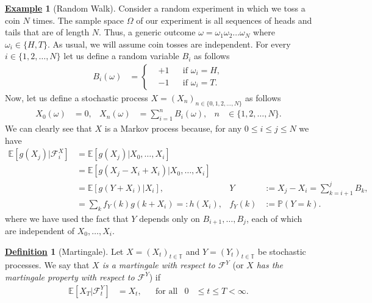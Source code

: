 \documentclass[12pt]{book}
\numberwithin{equation}{chapter}
\theoremstyle{plain}
\numberwithin{theorem}{section}
\theoremstyle{definition}
\newtheorem{definition}[theorem]{\underline{Definition}}
\newtheorem{example}[theorem]{\underline{Example}}
\numberwithin{exercise}{chapter}
\newcommand{\<}{\langle}
\renewcommand{\>}{\rangle}
\renewcommand{\(}{\left(}
\renewcommand{\)}{\right)}
\renewcommand{\[}{\left[}
\renewcommand{\]}{\right]}
\newcommand\Eb{\mathds{E}}
\newcommand\Pb{\mathds{P}}
\newcommand\Fc{\mathscr{F}}
\newcommand\om{\omega}
\newcommand\Om{\Omega}
\theoremstyle{definition}
\numberwithin{question}{section}
\begin{document}
\begin{example}[Random Walk]
\label{ex:rw}
Consider a random experiment in which we toss a coin $N$ times.
The sample space $\Om$ of our experiment is all sequences of heads and tails that are of length $N$.
Thus, a generic outcome $\om = \om_1 \om_2 \ldots \om_N$ where $\om_i \in \{H,T\}$.
As usual, we will assume coin tosses are independent.
For every $i \in \{ 1, 2, \ldots, N \}$ let us define a random variable $B_i$ as follows
\begin{align}
B_i(\om)
	&=	\left\{ \begin{aligned}
			&+1 &&\text{if $\om_i=H$} , \\
			&-1 &&\text{if $\om_i=T$} .
			\end{aligned} \right.
\end{align} 
Now, let us define a stochastic process $X = (X_n)_{n \in \{0,1,2,\ldots,N\}}$ as follows
\begin{align}
X_0(\om)
	&=	0 , &
X_n(\om)
	&=	\sum_{i=1}^n B_i(\om) , &
n
	&\in \{1, 2, \ldots, N \} .
\end{align}
We can clearly see that $X$ is a Markov process because, for any $0 \leq i \leq j \leq N$ we have
\begin{align}
\Eb[ g(X_j) | \Fc_i^X ]
	&=	\Eb[ g(X_j) | X_0, \ldots, X_i ] \\
	&=	\Eb[ g( X_j - X_i + X_i) | X_0, \ldots, X_i ] \\
	&=	\Eb[ g( Y + X_i) | X_i ] , &
Y
	&:=	X_j - X_i = \sum_{k=i+1}^j B_k , \\
	&=	\sum_{k} f_Y(k) g(k + X_i) =: h(X_i), &
f_Y(k)
	&:=	\Pb( Y = k) .
\end{align}
where we have used the fact that $Y$ depends only on $B_{i+1}, \ldots, B_j$, each of which are independent of $X_0, \ldots, X_i$.
\end{example}

\begin{definition}[Martingale]
\label{def:martingale}
Let $X = (X_t)_{t \in \mathds{T}}$ and $Y=(Y_t)_{t \in \mathds{T}}$ be stochastic processes.
We say that \textit{$X$ is a martingale with respect to $\Fc^Y$} (or \textit{$X$ has the martingale property with respect to $\Fc^Y$}) if
\begin{align}
\Eb[ X_T | \Fc_t^Y ]
	&=	X_t , &
	&\text{for all}&
0
	&\leq t \leq T < \infty.
\end{align}
\end{definition}
\end{document}
